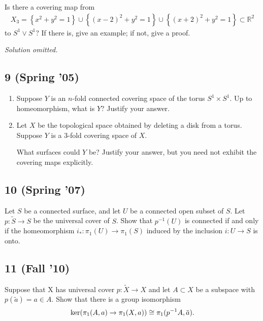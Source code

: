 Is there a covering map from
\begin{align*}
X_3 = \left\{{x^2 + y^2 = 1}\right\} \cup \left\{{(x - 2)^2 + y^2 = 1}\right\} \cup \left\{{(x + 2)^2 + y^2 = 1}\right\} \subset {\mathbb{R}}^2
\end{align*}
to \(S^1 \vee S^1\)? If there is, give an example; if not, give a proof.

\emph{Solution omitted.}

\hypertarget{spring-05-1}{%
\subsection{9 (Spring '05)}\label{spring-05-1}}

\begin{enumerate}
\def\labelenumi{\alph{enumi}.}
\item
  Suppose \(Y\) is an \(n\)-fold connected covering space of the torus
  \(S^1 \times S^1\). Up to homeomorphism, what is \(Y\)? Justify your
  answer.
\item
  Let \(X\) be the topological space obtained by deleting a disk from a
  torus. Suppose \(Y\) is a 3-fold covering space of \(X\).

  What surfaces could \(Y\) be? Justify your answer, but you need not
  exhibit the covering maps explicitly.
\end{enumerate}

\hypertarget{spring-07}{%
\subsection{10 (Spring '07)}\label{spring-07}}

Let \(S\) be a connected surface, and let \(U\) be a connected open
subset of \(S\). Let \(p : \tilde S \to S\) be the universal cover of
\(S\). Show that \(p^{-1}(U )\) is connected if and only if the
homeomorphism \(i_\ast : \pi_1 (U ) \to \pi_1 (S)\) induced by the
inclusion \(i : U \to S\) is onto.

\hypertarget{fall-10}{%
\subsection{11 (Fall '10)}\label{fall-10}}

Suppose that X has universal cover \(p : \tilde X \to X\) and let
\(A \subset X\) be a subspace with \(p(\tilde a) = a \in A\). Show that
there is a group isomorphism
\begin{align*}
\ker(\pi_1 (A, a) \to \pi_1 (X, a)) \cong \pi_1 (p^{-1}A, \mkern 1.5mu\overline{\mkern-1.5mua\mkern-1.5mu}\mkern 1.5mu)
.\end{align*}

